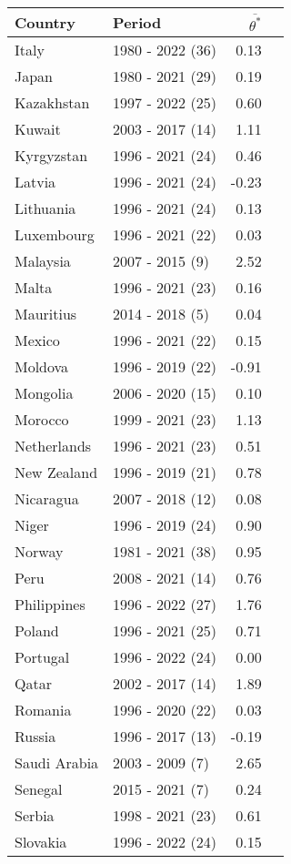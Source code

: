\begin{table}[pos=h]
{{\centering
\begin{tabular}{llrr} \toprule
Country & Period & $\overline{\theta^*}$\\
\midrule
Italy & 1980 - 2022 (36) & 0.13\\
Japan & 1980 - 2021 (29) & 0.19\\
Kazakhstan & 1997 - 2022 (25) & 0.60\\
Kuwait & 2003 - 2017 (14) & 1.11\\
Kyrgyzstan & 1996 - 2021 (24) & 0.46\\
\addlinespace
Latvia & 1996 - 2021 (24) & -0.23\\
Lithuania & 1996 - 2021 (24) & 0.13\\
Luxembourg & 1996 - 2021 (22) & 0.03\\
Malaysia & 2007 - 2015 (9) & 2.52\\
Malta & 1996 - 2021 (23) & 0.16\\
\addlinespace
Mauritius & 2014 - 2018 (5) & 0.04\\
Mexico & 1996 - 2021 (22) & 0.15\\
Moldova & 1996 - 2019 (22) & -0.91\\
Mongolia & 2006 - 2020 (15) & 0.10\\
Morocco & 1999 - 2021 (23) & 1.13\\
\addlinespace
Netherlands & 1996 - 2021 (23) & 0.51\\
New Zealand & 1996 - 2019 (21) & 0.78\\
Nicaragua & 2007 - 2018 (12) & 0.08\\
Niger & 1996 - 2019 (24) & 0.90\\
Norway & 1981 - 2021 (38) & 0.95\\
\addlinespace
Peru & 2008 - 2021 (14) & 0.76\\
Philippines & 1996 - 2022 (27) & 1.76\\
Poland & 1996 - 2021 (25) & 0.71\\
Portugal & 1996 - 2022 (24) & 0.00\\
Qatar & 2002 - 2017 (14) & 1.89\\
\addlinespace
Romania & 1996 - 2020 (22) & 0.03\\
Russia & 1996 - 2017 (13) & -0.19\\
Saudi Arabia & 2003 - 2009 (7) & 2.65\\
Senegal & 2015 - 2021 (7) & 0.24\\
Serbia & 1998 - 2021 (23) & 0.61\\
\addlinespace
Slovakia & 1996 - 2022 (24) & 0.15\\

\end{tabular}}}
\end{table}
